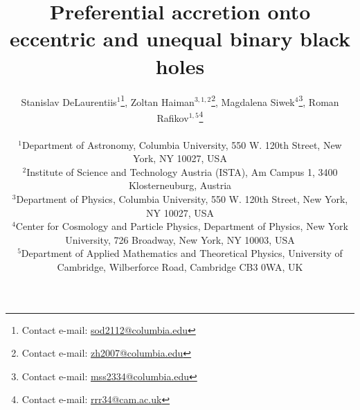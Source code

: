 \documentclass[fleqn,usenatbib]{mnras}
\begin{document}
\author[S. DeLaurentiis et al.]{
Stanislav DeLaurentiis$^{1}$\thanks{Contact e-mail: \href{mailto:sod2112@columbia.edu}{sod2112@columbia.edu}}, Zoltan Haiman$^{3,1,2}$\thanks{Contact e-mail: \href{mailto:zh2007@columbia.edu}{zh2007@columbia.edu}}, Magdalena Siwek$^{4}$\thanks{Contact e-mail: \href{mailto:mss2334@columbia.edu}{mss2334@columbia.edu}}, Roman Rafikov$^{1,5}$\thanks{Contact e-mail: \href{mailto:rrr34@cam.ac.uk}{rrr34@cam.ac.uk}} \\
\\
$^{1}$Department of Astronomy, Columbia University, 550 W. 120th Street, New York, NY 10027, USA\\
$^{2}$Institute of Science and Technology Austria (ISTA), Am Campus 1, 3400 Klosterneuburg, Austria\\
$^{3}$Department of Physics, Columbia University, 550 W. 120th Street, New York, NY 10027, USA\\
$^{4}$Center for Cosmology and Particle Physics, Department of Physics, New York University, 726 Broadway, New York, NY 10003, USA\\
$^{5}$Department of Applied Mathematics and Theoretical Physics, University of Cambridge, Wilberforce Road, Cambridge CB3 0WA, UK
}


\title{Preferential accretion onto eccentric and unequal binary black holes}


\date{}


\label{firstpage}
\pagerange{\pageref{firstpage}--\pageref{lastpage}}
\maketitle
\end{document}
